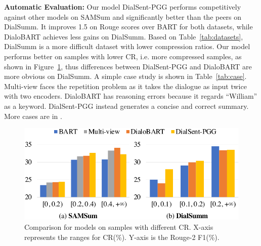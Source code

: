 \textbf{Automatic Evaluation:} 
Our model DialSent-PGG performs competitively against other models on 
SAMSum and significantly better than the peers on DialSumm. 
It improves 1.5 on Rouge scores over BART for both datasets, 
while DialoBART achieves less gains on DialSumm. 
Based on Table~\ref{tab:datasets}, DialSumm is a more difficult dataset 
with lower compression ratios. Our model performs better on samples 
with lower CR, i.e. more compressed samples, as shown in Figure~\ref{fig:cr}, thus differences 
between DialSent-PGG and DialoBART are more obvious on DialSumm. 
A simple case study is shown in Table~\ref{tab:case}.  
Multi-view faces the repetition problem as it takes the dialogue as 
input twice with two encoders. DialoBART has reasoning errors because 
it regards ``William'' as a keyword. DialSent-PGG instead generates a 
concise and correct summary. More cases are in .

\begin{figure}
	\centering
	\includegraphics[scale=0.45]{compressionratio.pdf}
	\caption{Comparison for models on samples with different CR. X-axis represents the ranges for CR(\%). Y-axis is the Rouge-2 F1(\%).}
	\label{fig:cr}
\end{figure}

